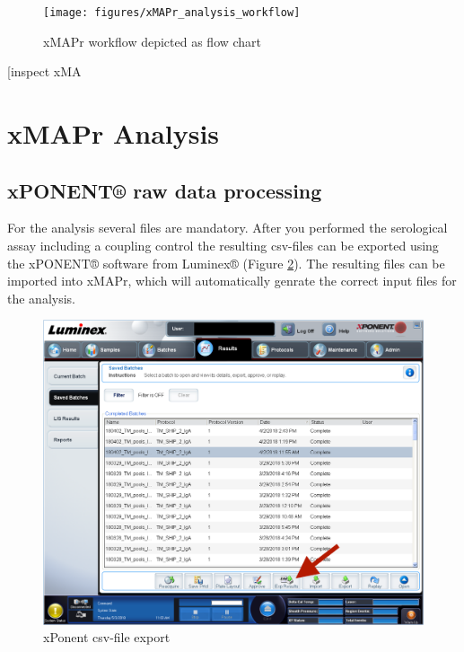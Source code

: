 \documentclass[
]{book}
\begin{document}
\begin{figure}

{\centering \texttt{[image: figures/xMAPr\_analysis\_workflow]} 

}

\caption{xMAPr workflow depicted as flow chart}\label{fig:xMAPrWorkflow}
\end{figure}

{[}inspect xMA

\hypertarget{xmapr-analysis}{%
\section{xMAPr Analysis}\label{xmapr-analysis}}

\hypertarget{xponent-raw-data-processing}{%
\subsection{xPONENT® raw data processing}\label{xponent-raw-data-processing}}

For the analysis several files are mandatory. After you performed the serological assay including a coupling control the resulting csv-files can be exported using the xPONENT® software from Luminex® (Figure \ref{fig:xPonentCSVexport}). The resulting files can be imported into xMAPr, which will automatically genrate the correct input files for the analysis.

\begin{figure}

{\centering \includegraphics[width=17.81in]{figures/xPonent_export} 

}

\caption{xPonent csv-file export}\label{fig:xPonentCSVexport}
\end{figure}
\end{document}

